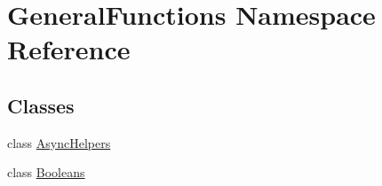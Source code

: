 \hypertarget{namespace_general_functions}{}\section{General\+Functions Namespace Reference}
\label{namespace_general_functions}
\subsection*{Classes}
\begin{DoxyCompactItemize}
\item 
class \hyperlink{class_general_functions_1_1_async_helpers}{Async\+Helpers}
\item 
class \hyperlink{class_general_functions_1_1_booleans}{Booleans}
\end{DoxyCompactItemize}
